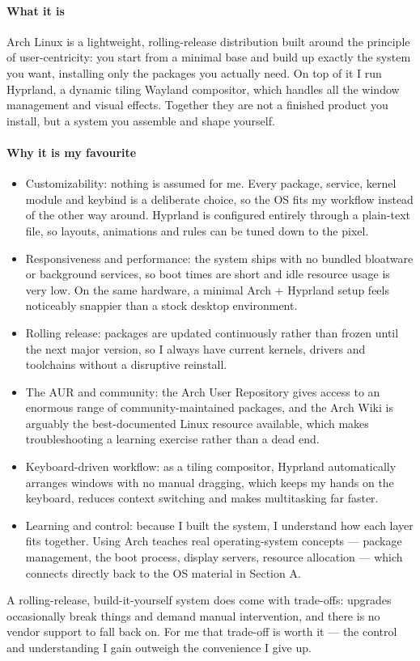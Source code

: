 \documentclass[a4paper,12pt]{article}
\begin{document}
\paragraph{What it is}
Arch Linux is a lightweight, rolling-release distribution built around the principle of user-centricity: you start from a minimal base and build up exactly the system you want, installing only the packages you actually need. On top of it I run Hyprland, a dynamic tiling Wayland compositor, which handles all the window management and visual effects. Together they are not a finished product you install, but a system you assemble and shape yourself.
\paragraph{Why it is my favourite}
\begin{itemize}
    \item Customizability: nothing is assumed for me. Every package, service, kernel module and keybind is a deliberate choice, so the OS fits my workflow instead of the other way around. Hyprland is configured entirely through a plain-text file, so layouts, animations and rules can be tuned down to the pixel.
    \item Responsiveness and performance: the system ships with no bundled bloatware or background services, so boot times are short and idle resource usage is very low. On the same hardware, a minimal Arch + Hyprland setup feels noticeably snappier than a stock desktop environment.
    \item Rolling release: packages are updated continuously rather than frozen until the next major version, so I always have current kernels, drivers and toolchains without a disruptive reinstall.
    \item The AUR and community: the Arch User Repository gives access to an enormous range of community-maintained packages, and the Arch Wiki is arguably the best-documented Linux resource available, which makes troubleshooting a learning exercise rather than a dead end.
    \item Keyboard-driven workflow: as a tiling compositor, Hyprland automatically arranges windows with no manual dragging, which keeps my hands on the keyboard, reduces context switching and makes multitasking far faster.
    \item Learning and control: because I built the system, I understand how each layer fits together. Using Arch teaches real operating-system concepts — package management, the boot process, display servers, resource allocation — which connects directly back to the OS material in Section A.
\end{itemize}
A rolling-release, build-it-yourself system does come with trade-offs: upgrades occasionally break things and demand manual intervention, and there is no vendor support to fall back on. For me that trade-off is worth it — the control and understanding I gain outweigh the convenience I give up.
\end{document}
